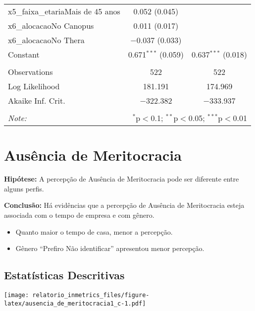 \documentclass[]{book}
\providecommand{\tightlist}{%
  \setlength{\itemsep}{0pt}\setlength{\parskip}{0pt}}
\begin{document}
\begin{table}[!htbp]
\begin{tabular}{@{\extracolsep{5pt}}lcc}
  x5\_faixa\_etariaMais de 45 anos & 0.052 (0.045) &  \\ 
  x6\_alocacaoNo Canopus & 0.011 (0.017) &  \\ 
  x6\_alocacaoNo Thera & $-$0.037 (0.033) &  \\ 
  Constant & 0.671$^{***}$ (0.059) & 0.637$^{***}$ (0.018) \\ 
 \hline \\[-1.8ex] 
Observations & 522 & 522 \\ 
Log Likelihood & 181.191 & 174.969 \\ 
Akaike Inf. Crit. & $-$322.382 & $-$333.937 \\ 
\hline 
\hline \\[-1.8ex] 
\textit{Note:}  & \multicolumn{2}{r}{$^{*}$p$<$0.1; $^{**}$p$<$0.05; $^{***}$p$<$0.01} \\ 
\end{tabular} 
\end{table}

\pagebreak

\hypertarget{ausencia-de-meritocracia-1}{%
\section{Ausência de Meritocracia}\label{ausencia-de-meritocracia-1}}

\textbf{Hipótese:} A percepção de Ausência de Meritocracia pode ser diferente entre alguns perfis.

\textbf{Conclusão:} Há evidências que a percepção de Ausência de Meritocracia esteja associada com o tempo de empresa e com gênero.

\begin{itemize}
\tightlist
\item
  Quanto maior o tempo de casa, menor a percepção.
\item
  Gênero ``Prefiro Não identificar'' apresentou menor percepção.
\end{itemize}

\hypertarget{estatisticas-descritivas-6}{%
\subsection{Estatísticas Descritivas}\label{estatisticas-descritivas-6}}

\texttt{[image: relatorio\_inmetrics\_files/figure-latex/ausencia\_de\_meritocracia1\_c-1.pdf]}
\end{document}
